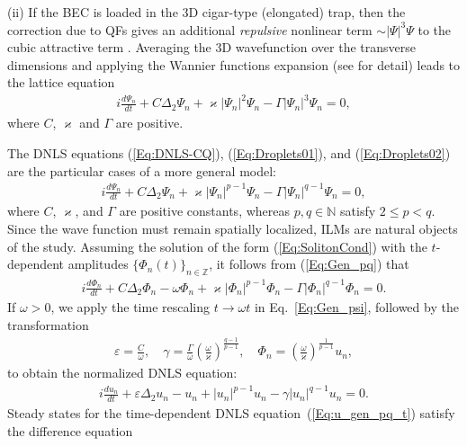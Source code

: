 \documentclass[12pt,reqno]{amsart}
\begin{document}
(ii) If the BEC is loaded in the 3D cigar-type (elongated) trap, then the correction due to QFs gives an additional {\it repulsive} nonlinear term $\sim |\Psi|^3\Psi$ to the cubic attractive term \cite{Edm20,Droplets03,Deb22,Nat22,AKA25}.  Averaging the 3D wavefunction over the transverse dimensions and applying the Wannier functions expansion (see \cite{Droplets03} for detail) leads to the lattice equation
\begin{gather}
    i\frac{d\Psi_n}{d t}+C\Delta_2\Psi_n+\varkappa\left|\Psi_n\right|^2\Psi_n-\Gamma\left|\Psi_n\right|^3\Psi_n=0,\label{Eq:Droplets02}
\end{gather}
where  $C$, $\varkappa$ and $\Gamma$ are positive. 

The DNLS equations (\ref{Eq:DNLS-CQ}), (\ref{Eq:Droplets01}), and (\ref{Eq:Droplets02}) are the particular cases of a more general model:
\begin{gather}
    i\frac{d\Psi_n}{d t}+C\Delta_2\Psi_n+ \varkappa\left|\Psi_n\right|^{p-1}\Psi_n-\Gamma\left|\Psi_n\right|^{q-1}\Psi_n=0,\label{Eq:Gen_pq}
\end{gather}
where $C$, $\varkappa$, and $\Gamma$ are positive constants, whereas $p,q\in \mathbb{N}$ satisfy $2 \leq p < q$. Since the wave function must remain spatially localized, ILMs are natural objects of the study. Assuming the solution of the form (\ref{Eq:SolitonCond}) with the $t$-dependent amplitudes $\{\Phi_n(t)\}_{n \in \mathbb{Z}}$, it follows from (\ref{Eq:Gen_pq}) that
\begin{gather}
    i\frac{d\Phi_n}{d t} + C\Delta_2 \Phi_n -\omega \Phi_n + \varkappa\left|\Phi_n\right|^{p-1} \Phi_n - \Gamma \left|\Phi_n\right|^{q-1} \Phi_n=0.
    \label{Eq:Gen_psi}
\end{gather}
If $\omega > 0$, we apply the time rescaling $t\to \omega t$ in  Eq.~\eqref{Eq:Gen_psi}, followed by the transformation
\begin{gather*}
    \varepsilon = \frac{C}{\omega}, \quad \gamma = \frac{\Gamma}{\omega} \left(\frac{\omega}{\varkappa}\right)^{\frac{q-1}{p-1}}, \quad \Phi_n = \left(\frac{\omega}{\varkappa}\right)^{\frac{1}{p-1}} u_n,
\end{gather*}
to obtain the normalized DNLS equation:
\begin{gather}
    i\frac{du_n}{d t} + \varepsilon\Delta_2u_n- u_n+\left|u_n\right|^{p-1} u_n-\gamma\left|u_n\right|^{q-1} u_n=0.
    \label{Eq:u_gen_pq_t}
\end{gather}
Steady states for the time-dependent DNLS equation~(\ref{Eq:u_gen_pq_t}) satisfy the difference equation
\end{document}
